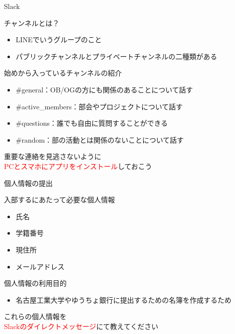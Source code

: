 \documentclass[12pt, unicode]{beamer}
\begin{document}
\begin{frame}{Slack}
    \begin{block}{チャンネルとは？}
        \begin{itemize}
            \item LINEでいうグループのこと
            \item パブリックチャンネルとプライベートチャンネルの二種類がある
        \end{itemize}
    \end{block}

    \begin{block}{始めから入っているチャンネルの紹介}
        \begin{itemize}
            \item \#general：OB/OGの方にも関係のあることについて話す
            \item \#active\_members：部会やプロジェクトについて話す
            \item \#questions：誰でも自由に質問することができる
            \item \#random：部の活動とは関係のないことについて話す
        \end{itemize}
    \end{block}

    \begin{center}
        {\large 重要な連絡を見逃さないように\\\textcolor{red}{PCとスマホにアプリをインストール}しておこう}
    \end{center}
\end{frame}

\begin{frame}{個人情報の提出}
    \begin{block}{入部するにあたって必要な個人情報}
        \begin{itemize}
            \item 氏名
            \item 学籍番号
            \item 現住所
            \item メールアドレス
        \end{itemize}
    \end{block}

    \begin{block}{個人情報の利用目的}
        \begin{itemize}
            \item 名古屋工業大学やゆうちょ銀行に提出するための名簿を作成するため
        \end{itemize}
    \end{block}

    \begin{center}
        {\large これらの個人情報を\\\textcolor{red}{Slackのダイレクトメッセージ}にて教えてください}
    \end{center}
\end{frame}
\end{document}
